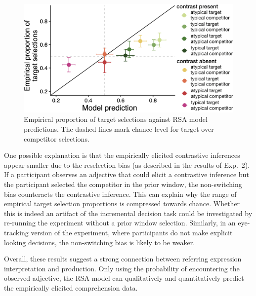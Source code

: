 \documentclass[10pt,letterpaper]{article}
\begin{document}
\begin{figure}
	\begin{center}
		\includegraphics[width=.475\textwidth]{graphs/corr-plot.pdf}
	\end{center}
\caption{Empirical proportion of target selections against RSA model predictions. The dashed lines mark chance level for target over competitor selections.} 
\label{model-results-corr-flatprior}
\end{figure}

One possible explanation is that the empirically elicited contrastive inferences appear smaller due to the reselection bias (as described in the results of Exp.~2). If a participant observes an adjective that could elicit a contrastive inference but the participant selected the competitor in the prior window, the non-switching bias counteracts the contrastive inference. This can explain why the range of empirical target selection proportions is compressed towards chance. Whether this is indeed an artifact of the incremental decision task could be investigated by re-running the experiment without a prior window selection. Similarly, in an eye-tracking version of the experiment, where participants do not make explicit looking decisions, the non-switching bias is likely to be weaker.


Overall, these results suggest a strong connection between referring expression interpretation and production. Only using the probability of encountering the observed adjective, the RSA model can qualitatively and quantitatively predict the empirically elicited comprehension data. 
\end{document}
